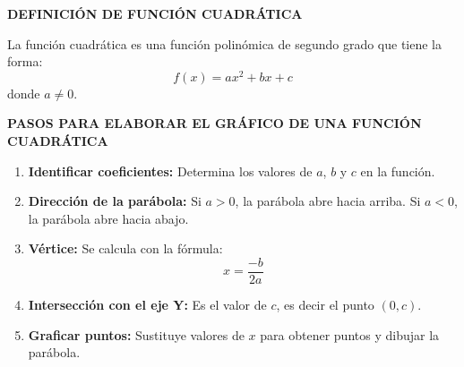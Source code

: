

\textbf{DEFINICIÓN DE FUNCIÓN CUADRÁTICA}

La función cuadrática es una función polinómica de segundo grado que tiene la forma:
\[
f(x) = ax^2 + bx + c
\]
donde $a \neq 0$.

\textbf{PASOS PARA ELABORAR EL GRÁFICO DE UNA FUNCIÓN CUADRÁTICA}

\begin{enumerate}

\item \textbf{Identificar coeficientes:}  
Determina los valores de $a$, $b$ y $c$ en la función.

\item \textbf{Dirección de la parábola:}  
Si $a > 0$, la parábola abre hacia arriba.  
Si $a < 0$, la parábola abre hacia abajo.

\item \textbf{Vértice:}  
Se calcula con la fórmula:
\[
x = \frac{-b}{2a}
\]

\item \textbf{Intersección con el eje Y:}  
Es el valor de $c$, es decir el punto $(0, c)$.

\item \textbf{Graficar puntos:}  
Sustituye valores de $x$ para obtener puntos y dibujar la parábola.

\end{enumerate}

